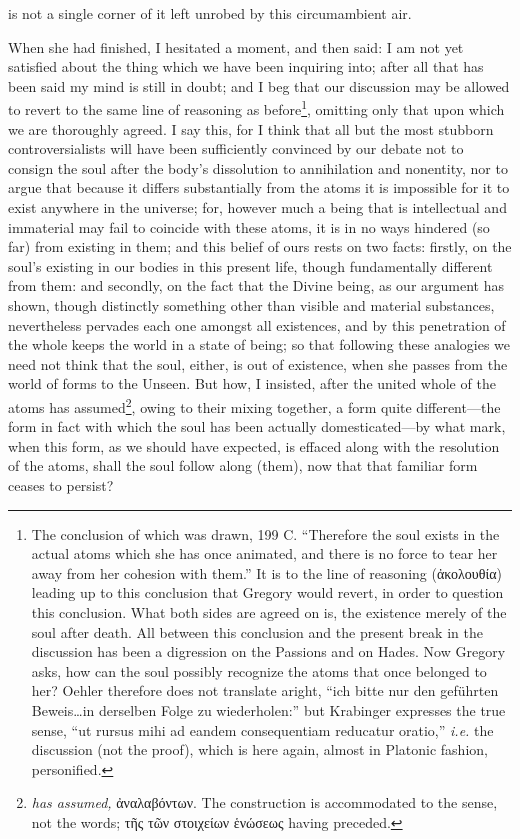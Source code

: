 is not a single corner of it left unrobed by this circumambient air.

When she had finished, I hesitated a moment, and then said: I am not yet satisfied about the thing which we have been inquiring into; after all that has been said my mind is still in doubt; and I beg that our discussion may be allowed to revert to the same line of reasoning as before\footnote{The conclusion of which was drawn, 199 C. “Therefore the soul exists in the actual atoms which she has once animated, and there is no force to tear her away from her cohesion with them.” It is to the line of reasoning (\textgreek{ἀκολουθία}) leading up to this conclusion that Gregory would revert, in order to question this conclusion. What both sides are agreed on is, the existence merely of the soul after death. All between this conclusion and the present break in the discussion has been a digression on the Passions and on Hades. Now Gregory asks, how can the soul possibly recognize the atoms that once belonged to her? Oehler therefore does not translate aright, “ich bitte nur den geführten Beweis…in derselben Folge zu wiederholen:” but Krabinger expresses the true sense, “ut rursus mihi ad eandem consequentiam reducatur oratio,” \emph{i.e.} the discussion (not the proof), which is here again, almost in Platonic fashion, personified.}, omitting only that upon which we are thoroughly agreed. I say this, for I think that all but the most stubborn controversialists will have been sufficiently convinced by our debate not to consign the soul after the body’s dissolution to annihilation and nonentity, nor to argue that because it differs substantially from the atoms it is impossible for it to exist anywhere in the universe; for, however much a being that is intellectual and immaterial may fail to coincide with these atoms, it is in no ways hindered (so far) from existing in them; and this belief of ours rests on two facts: firstly, on the soul’s existing in our bodies in this present life, though fundamentally different from them: and secondly, on the fact that the Divine being, as our argument has shown, though distinctly something other than visible and material substances, nevertheless pervades each one amongst all existences, and by this penetration of the whole keeps the world in a state of being; so that following these analogies we need not think that the soul, either, is out of existence, when she passes from the world of forms to the Unseen. But how, I insisted, after the united whole of the atoms has assumed\footnote{\emph{has assumed,} \textgreek{ἀναλαβόντων}. The construction is accommodated to the sense, not the words; \textgreek{τῆς τῶν στοιχείων ἑνώσεως} having preceded.}, owing to their mixing together, a form quite different—the form in fact with which the soul has been actually domesticated—by what mark, when this form, as we should have expected, is effaced along with the resolution of the atoms, shall the soul follow along (them), now that that familiar form ceases to persist?

